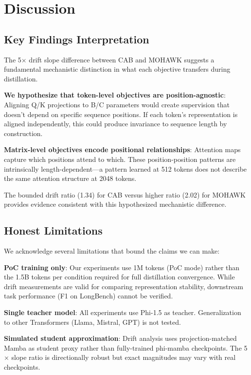 \section{Discussion}

\subsection{Key Findings Interpretation}

The 5$\times$ drift slope difference between CAB and MOHAWK suggests a fundamental mechanistic distinction in what each objective transfers during distillation.

\textbf{We hypothesize that token-level objectives are position-agnostic}: Aligning Q/K projections to B/C parameters would create supervision that doesn't depend on specific sequence positions. If each token's representation is aligned independently, this could produce invariance to sequence length by construction.

\textbf{Matrix-level objectives encode positional relationships}: Attention maps capture which positions attend to which. These position-position patterns are intrinsically length-dependent---a pattern learned at 512 tokens does not describe the same attention structure at 2048 tokens.

The bounded drift ratio (1.34) for CAB versus higher ratio (2.02) for MOHAWK provides evidence consistent with this hypothesized mechanistic difference.

\subsection{Honest Limitations}

We acknowledge several limitations that bound the claims we can make:

\textbf{PoC training only}: Our experiments use 1M tokens (PoC mode) rather than the 1.5B tokens per condition required for full distillation convergence. While drift measurements are valid for comparing representation stability, downstream task performance (F1 on LongBench) cannot be verified.

\textbf{Single teacher model}: All experiments use Phi-1.5 as teacher. Generalization to other Transformers (Llama, Mistral, GPT) is not tested.

\textbf{Simulated student approximation}: Drift analysis uses projection-matched Mamba as student proxy rather than fully-trained phi-mamba checkpoints. The 5$\times$ slope ratio is directionally robust but exact magnitudes may vary with real checkpoints.

